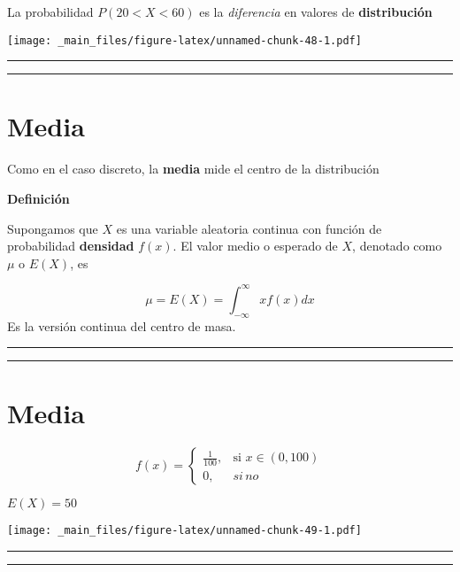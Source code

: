 \documentclass[
]{book}
\begin{document}
La probabilidad \(P(20<X<60)\) es la \emph{diferencia} en valores de \textbf{distribución}

\texttt{[image: \_main\_files/figure-latex/unnamed-chunk-48-1.pdf]}

\begin{center}\rule{0.5\linewidth}{0.5pt}\end{center}

\begin{center}\rule{0.5\linewidth}{0.5pt}\end{center}

\hypertarget{media-1}{%
\section{Media}\label{media-1}}

Como en el caso discreto, la \textbf{media} mide el centro de la distribución

\textbf{Definición}

Supongamos que \(X\) es una variable aleatoria continua con función de probabilidad \textbf{densidad} \(f(x)\). El valor medio o esperado de \(X\), denotado como \(\mu\) o \(E(X)\), es

\[\mu=E(X)=\int_{-\infty}^\infty x f(x) dx\]
Es la versión continua del centro de masa.

\begin{center}\rule{0.5\linewidth}{0.5pt}\end{center}

\begin{center}\rule{0.5\linewidth}{0.5pt}\end{center}

\hypertarget{media-2}{%
\section{Media}\label{media-2}}

\[
    f(x)= 
\begin{cases}
    \frac{1}{100},& \text{si } x\in (0,100)\\
    0,& si \, no 
\end{cases}
\]

\(E(X)=50\)

\texttt{[image: \_main\_files/figure-latex/unnamed-chunk-49-1.pdf]}

\begin{center}\rule{0.5\linewidth}{0.5pt}\end{center}

\begin{center}\rule{0.5\linewidth}{0.5pt}\end{center}
\end{document}
